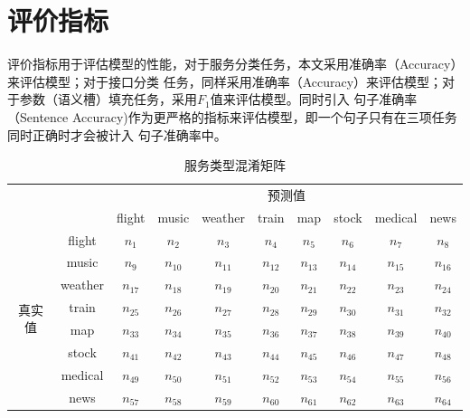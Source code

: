 \section{评价指标}
评价指标用于评估模型的性能，对于服务分类任务，本文采用准确率（Accuracy）来评估模型；对于接口分类
任务，同样采用准确率（Accuracy）来评估模型；对于参数（语义槽）填充任务，采用$F_1$值来评估模型。同时引入
句子准确率（Sentence Accuracy)作为更严格的指标来评估模型，即一个句子只有在三项任务同时正确时才会被计入
句子准确率中。

 \begin{table}[htb]
      \centering
      \caption{服务类型混淆矩阵}
      \label{tab:hunxiao}
  \begin{tabular}{c|c|c|c|c|c|c|c|c|c}
    \toprule
    \multicolumn{2}{c|}{\multirow{2}{*}{}}&
    \multicolumn{8}{c}{预测值}\\
    \cline{3-10}
    \multicolumn{2}{c|}{}&flight & music & weather & train & map &stock &medical & news \\
     \hline
     \multirow{8}{*}{真实值}&
     flight&$n_1$&$n_2$&$n_3$&$n_4$&$n_5$&$n_6$&$n_7$&$n_8$\\
     \cline{2-10}
     \multicolumn{1}{c|}{}&music&$n_{9}$&$n_{10}$&$n_{11}$&$n_{12}$&$n_{13}$&$n_{14}$&$n_{15}$&$n_{16}$\\
     \cline{2-10}
     \multicolumn{1}{c|}{}&weather&$n_{17}$&$n_{18}$&$n_{19}$&$n_{20}$&$n_{21}$&$n_{22}$&$n_{23}$&$n_{24}$\\
     \cline{2-10}
     \multicolumn{1}{c|}{}&train&$n_{25}$&$n_{26}$&$n_{27}$&$n_{28}$&$n_{29}$&$n_{30}$&$n_{31}$&$n_{32}$\\
     \cline{2-10}
     \multicolumn{1}{c|}{}&map&$n_{33}$&$n_{34}$&$n_{35}$&$n_{36}$&$n_{37}$&$n_{38}$&$n_{39}$&$n_{40}$\\
     \cline{2-10}
     \multicolumn{1}{c|}{}&stock&$n_{41}$&$n_{42}$&$n_{43}$&$n_{44}$&$n_{45}$&$n_{46}$&$n_{47}$&$n_{48}$\\
     \cline{2-10}
     \multicolumn{1}{c|}{}&medical&$n_{49}$&$n_{50}$&$n_{51}$&$n_{52}$&$n_{53}$&$n_{54}$&$n_{55}$&$n_{56}$\\
     \cline{2-10}
     \multicolumn{1}{c|}{}&news&$n_{57}$&$n_{58}$&$n_{59}$&$n_{60}$&$n_{61}$&$n_{62}$&$n_{63}$&$n_{64}$\\
    \bottomrule
    \end{tabular}
  \end{table}


